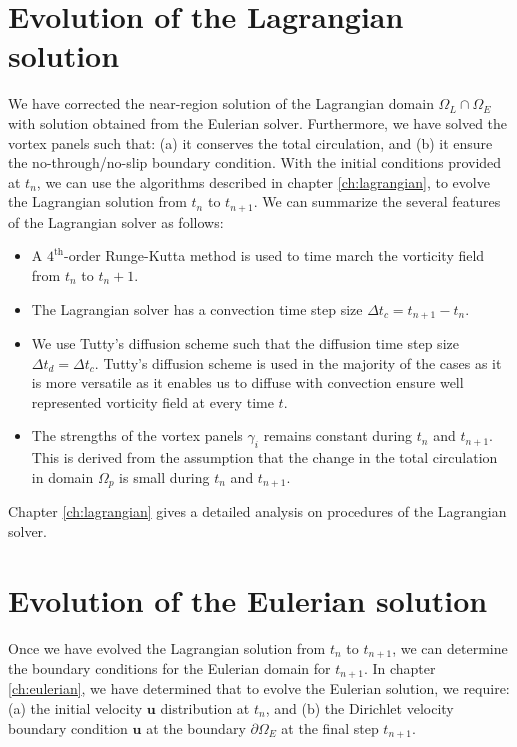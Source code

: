 \section{Evolution of the Lagrangian solution}
\label{sec:evolveLagrangian}

We have corrected the near-region solution of the Lagrangian domain $\Omega_L \cap \Omega_E$ with solution obtained from the Eulerian solver. Furthermore, we have solved the vortex panels such that: (a) it conserves the total circulation, and (b) it ensure the no-through/no-slip boundary condition. With the initial conditions provided at $t_n$, we can use the algorithms described in chapter \ref{ch:lagrangian}, to evolve the Lagrangian solution from $t_n$ to $t_{n+1}$. We can summarize the several features of the Lagrangian solver as follows:
\begin{itemize}
\item A $4^{\mathrm{th}}$-order Runge-Kutta method is used to time march the vorticity field from $t_n$ to $t_{n}+1$.
\item The Lagrangian solver has a convection time step size $\Delta t_c = t_{n+1}-t_n$.
\item We use Tutty's diffusion scheme such that the diffusion time step size $\Delta t_d = \Delta t_c$. Tutty's diffusion scheme is used in the majority of the cases as it is more versatile as it enables us to diffuse with convection ensure well represented vorticity field at every time $t$.
\item The strengths of the vortex panels $\gamma_i$ remains constant during $t_n$ and $t_{n+1}$. This is derived from the assumption that the change in the total circulation in domain $\Omega_p$ is small during $t_n$ and $t_{n+1}$.
\end{itemize}

Chapter \ref{ch:lagrangian} gives a detailed analysis on procedures of the Lagrangian solver. 

\section{Evolution of the Eulerian solution}
\label{sec:evolveEulerian}

Once we have evolved the Lagrangian solution from $t_n$ to $t_{n+1}$, we can determine the boundary conditions for the Eulerian domain for $t_{n+1}$. In chapter \ref{ch:eulerian}, we have determined that to evolve the Eulerian solution, we require: (a) the initial velocity $\mathbf{u}$ distribution at $t_n$, and (b) the Dirichlet velocity boundary condition $\mathbf{u}$ at the boundary $\partial \Omega_E$ at the final step $t_{n+1}$.

